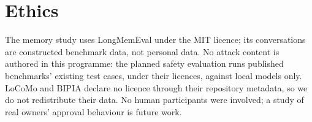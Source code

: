 \section{Ethics}
\label{sec:ethics}

The memory study uses LongMemEval under the MIT licence; its conversations are constructed benchmark
data, not personal data. No attack content is authored in this programme: the planned safety
evaluation runs published benchmarks' existing test cases, under their licences, against local models
only. LoCoMo and BIPIA declare no licence through their repository metadata, so we do not redistribute
their data. No human participants were involved; a study of real owners' approval behaviour is future
work.
